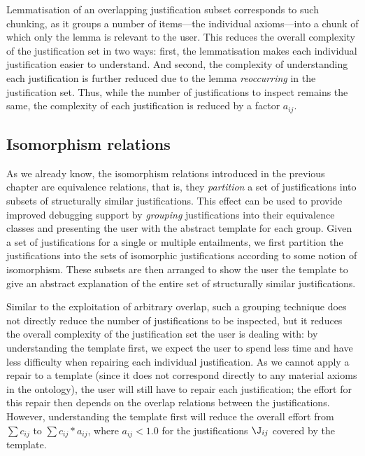 Lemmatisation of an overlapping justification subset corresponds to such chunking, as it groups a number of items---the individual axioms---into a chunk of which only the lemma is relevant to the user. This reduces the overall complexity of the justification set in two ways: first, the lemmatisation makes each individual justification easier to understand. And second, the complexity of understanding each justification is further reduced due to the lemma \emph{reoccurring} in the justification set. Thus, while the number of justifications to inspect remains the same, the complexity of each justification is reduced by a factor $a_{ij}$.


\subsection{Isomorphism relations}
As we already know, the isomorphism relations introduced in the previous chapter are equivalence relations, that is, they \emph{partition} a set of justifications into subsets of structurally similar justifications. This effect can be used to provide improved debugging support by \emph{grouping} justifications into their equivalence classes and presenting the user with the abstract template for each group. Given a set of justifications for a single or multiple entailments, we first partition the justifications into the sets of isomorphic justifications according to some notion of isomorphism. These subsets are then arranged to show the user the template \jtemplate to give an abstract explanation of the entire set of structurally similar justifications. 

Similar to the exploitation of arbitrary overlap, such a grouping technique does not directly reduce the number of justifications to be inspected, but it reduces the overall complexity of the justification set the user is dealing with: by understanding the template first, we expect the user to spend less time and have less difficulty when repairing each individual justification. As we cannot apply a repair to a template (since it does not correspond directly to any material axioms in the ontology), the user will still have to repair each justification; the effort for this repair then depends on the overlap relations between the justifications. However, understanding the template first will reduce the overall effort from $\sum c_{ij}$ to $\sum c_{ij} * a_{ij}$, where $a_{ij} < 1.0$ for the justifications $\J_{ij}$ covered by the template.


